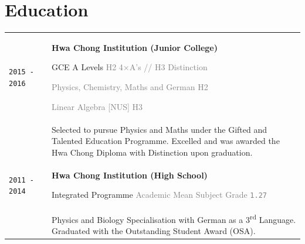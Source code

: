 \documentclass[11pt]{article}
\newcommand{\nummer}[1]{\texttt{\large #1}}
\begin{document}
\section{\textcolor{section_1}{Education}}
\vspace{-\baselineskip}
{
	\renewcommand{\arraystretch}{2}
	\begin{tabularx}{\textwidth}{@{}l p{0.3cm} X@{}}
		\texttt{\large 2015 - 2016} & & \textbf{Hwa Chong Institution (Junior College)} \par \vspace{1mm} GCE A Levels \hfill \textcolor{gray}{H2 4$\times$A's // H3 Distinction}\par \hfill \textcolor{gray}{{\scriptsize Physics, Chemistry, Maths and German} \hspace{1em} H2}\par \hfill \textcolor{gray}{{\scriptsize Linear Algebra [NUS]} \hspace{1em} H3} \\[-0.5em]
		&& {\small Selected to pursue Physics and Maths under the Gifted and Talented Education Programme. Excelled and was awarded the Hwa Chong Diploma with Distinction upon graduation.} \\
		\texttt{\large 2011 - 2014} & & \textbf{Hwa Chong Institution (High School)} \par Integrated Programme \hfill \textcolor{gray}{{\scriptsize Academic Mean Subject Grade} \nummer{\large 1.27}} \\[-0.5em]
		&& {\small Physics and Biology Specialisation with German as a 3\textsuperscript{rd} Language. Graduated with the Outstanding Student Award {\footnotesize (OSA)}. }
	\end{tabularx}
}
\end{document}
